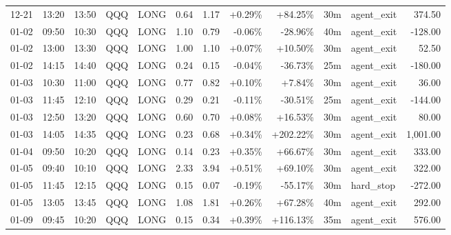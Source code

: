 \documentclass[11pt,a4paper,twoside]{article}
\begin{document}
\begin{center}
\begin{longtable}{>{\color{txtmain}}l l l l l r r r r r >{\color{txtmain}}l r}
12-21 & 13:20 & 13:50 & QQQ & LONG & 0.64 & 1.17 & \textcolor{wingreen}{+0.29\%} & \textcolor{wingreen}{+84.25\%} & 30m & agent\_exit & \textcolor{wingreen}{374.50} \\
01-02 & 09:50 & 10:30 & QQQ & LONG & 1.10 & 0.79 & \textcolor{lossred}{-0.06\%} & \textcolor{lossred}{-28.96\%} & 40m & agent\_exit & \textcolor{lossred}{-128.00} \\
01-02 & 13:00 & 13:30 & QQQ & LONG & 1.00 & 1.10 & \textcolor{wingreen}{+0.07\%} & \textcolor{wingreen}{+10.50\%} & 30m & agent\_exit & \textcolor{wingreen}{52.50} \\
01-02 & 14:15 & 14:40 & QQQ & LONG & 0.24 & 0.15 & \textcolor{lossred}{-0.04\%} & \textcolor{lossred}{-36.73\%} & 25m & agent\_exit & \textcolor{lossred}{-180.00} \\
01-03 & 10:30 & 11:00 & QQQ & LONG & 0.77 & 0.82 & \textcolor{wingreen}{+0.10\%} & \textcolor{wingreen}{+7.84\%} & 30m & agent\_exit & \textcolor{wingreen}{36.00} \\
01-03 & 11:45 & 12:10 & QQQ & LONG & 0.29 & 0.21 & \textcolor{lossred}{-0.11\%} & \textcolor{lossred}{-30.51\%} & 25m & agent\_exit & \textcolor{lossred}{-144.00} \\
01-03 & 12:50 & 13:20 & QQQ & LONG & 0.60 & 0.70 & \textcolor{wingreen}{+0.08\%} & \textcolor{wingreen}{+16.53\%} & 30m & agent\_exit & \textcolor{wingreen}{80.00} \\
01-03 & 14:05 & 14:35 & QQQ & LONG & 0.23 & 0.68 & \textcolor{wingreen}{+0.34\%} & \textcolor{wingreen}{+202.22\%} & 30m & agent\_exit & \textcolor{wingreen}{1,001.00} \\
01-04 & 09:50 & 10:20 & QQQ & LONG & 0.14 & 0.23 & \textcolor{wingreen}{+0.35\%} & \textcolor{wingreen}{+66.67\%} & 30m & agent\_exit & \textcolor{wingreen}{333.00} \\
01-05 & 09:40 & 10:10 & QQQ & LONG & 2.33 & 3.94 & \textcolor{wingreen}{+0.51\%} & \textcolor{wingreen}{+69.10\%} & 30m & agent\_exit & \textcolor{wingreen}{322.00} \\
01-05 & 11:45 & 12:15 & QQQ & LONG & 0.15 & 0.07 & \textcolor{lossred}{-0.19\%} & \textcolor{lossred}{-55.17\%} & 30m & hard\_stop & \textcolor{lossred}{-272.00} \\
01-05 & 13:05 & 13:45 & QQQ & LONG & 1.08 & 1.81 & \textcolor{wingreen}{+0.26\%} & \textcolor{wingreen}{+67.28\%} & 40m & agent\_exit & \textcolor{wingreen}{292.00} \\
01-09 & 09:45 & 10:20 & QQQ & LONG & 0.15 & 0.34 & \textcolor{wingreen}{+0.39\%} & \textcolor{wingreen}{+116.13\%} & 35m & agent\_exit & \textcolor{wingreen}{576.00} \\

\end{longtable}
\end{center}
\end{document}
